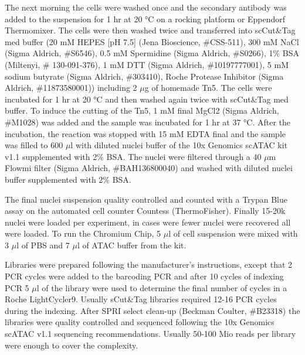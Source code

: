 The next morning the cells were washed once and the secondary antibody was added to the suspension for 1 hr at 20 °C on a rocking platform or Eppendorf Thermomixer. The cells were then washed twice and transferred into scCut\&Tag med buffer (20 mM HEPES [pH 7.5] (Jena Bioscience, \#CSS-511), 300 mM NaCl (Sigma Aldrich, \#S6546), 0.5 mM Spermidine (Sigma Aldrich, \#S0266), 1\% BSA (Miltenyi, \# 130-091-376), 1 mM DTT (Sigma Aldrich, \#10197777001), 5 mM sodium butyrate (Sigma Aldrich, \#303410), Roche Protease Inhibitor (Sigma Aldrich, \#11873580001)) including 2 $\mu$g of homemade Tn5. The cells were incubated for 1 hr at 20 °C and then washed again twice with scCut\&Tag med buffer. To induce the cutting of the Tn5, 1 mM final MgCl2 (Sigma Aldrich, \#M1028) was added and the sample was incubated for 1 hr at 37 °C. After the incubation, the reaction was stopped with 15 mM EDTA final and the sample was filled to 600 $\mu$l with diluted nuclei buffer of the 10x Genomics scATAC kit v1.1 supplemented with 2\% BSA. The nuclei were filtered through a 40 $\mu$m Flowmi filter (Sigma Aldrich, \#BAH136800040) and washed with diluted nuclei buffer supplemented with 2\% BSA.

The final nuclei suspension quality controlled and counted with a Trypan Blue assay on the automated cell counter Countess (ThermoFisher). Finally 15-20k nuclei were loaded per experiment, in cases were fewer nuclei were recovered all were loaded. To run the Chromium Chip, 5 $\mu$l of cell suspension were mixed with 3 $\mu$l of PBS and 7 $\mu$l of ATAC buffer from the kit. 

Libraries were prepared following the manufacturer's instructions, except that 2 PCR cycles were added to the barcoding PCR and after 10 cycles of indexing PCR 5 $\mu$l of the library were used to determine the final number of cycles in a Roche LightCycler9. Usually sCut\&Tag libraries required 12-16 PCR cycles during the indexing. After SPRI select clean-up (Beckman Coulter, \#B23318) the libraries were quality controlled and sequenced following the 10x Genomics scATAC v1.1 sequencing recommendations. Usually 50-100 Mio reads per library were enough to cover the complexity. 

